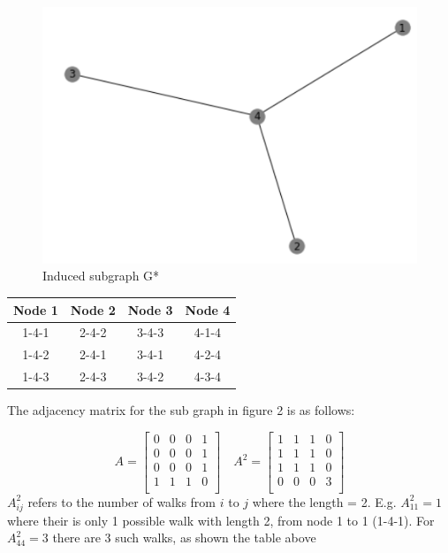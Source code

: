 \documentclass[a4paper,12pt]{article}
\begin{document}
\begin{figure}[h]
	\begin{center}
    \includegraphics[scale=0.5]{induced.png}
    \caption{Induced subgraph G*}
	\end{center}
\end{figure}

\begin{table}[h]
\centering
\begin{tabular}{c|c|c|c}
Node 1 & Node 2 & Node 3 & Node 4\\
\hline
1-4-1 & 2-4-2 & 3-4-3 & 4-1-4\\
1-4-2 & 2-4-1 & 3-4-1 & 4-2-4\\
1-4-3 & 2-4-3 & 3-4-2 & 4-3-4\\
\end{tabular}
\end{table}

The adjacency matrix for the sub graph in figure 2 is as follows:

	$$
	A = \begin{bmatrix} 
		0&0&0&1\\
		0&0&0&1\\
		0&0&0&1\\
		1&1&1&0\\
	\end{bmatrix} \quad
	A^2 = \begin{bmatrix} 
		1&1&1&0\\
		1&1&1&0\\
		1&1&1&0\\
		0&0&0&3\\
	\end{bmatrix}
	$$
$A^2_{ij}$ refers to the number of walks from $i$ to $j$ where the length = 2. E.g. $A^2_{11} = 1$ where their is only 1 possible walk with length 2, from node 1 to 1 (1-4-1). For $A^2_{44} = 3$ there are 3 such walks, as shown the table above
\end{document}
